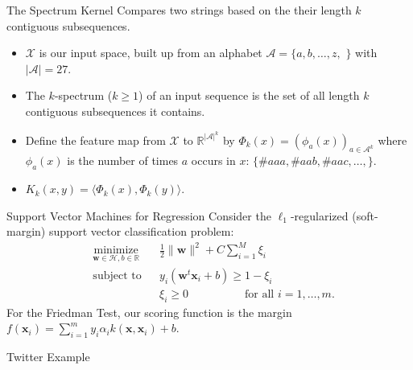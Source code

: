 \documentclass{beamer}
\providecommand{\norm}[1]{\lVert#1\rVert}
\begin{document}
\begin{frame}{The Spectrum Kernel}
  Compares two strings based on the their length $k$ contiguous
  subsequences. \pause
  \begin{itemize}
  \item $\mathcal{X}$ is our input space, built up from an alphabet
    $\mathcal{A} = \{a,b,\ldots,z,$ $\}$ with $|\mathcal{A}|=27$. \pause
  \item The $k$-spectrum ($k \geq 1$) of an input sequence is the set
    of all length $k$ contiguous subsequences it contains. \pause
  \item Define the feature map from $\mathcal{X}$ to
    $\mathbb{R}^{|\mathcal{A}|^k}$ by $\Phi_k(x) = (\phi_a(x))_{a \in
      \mathcal{A}^k}$ where $\phi_a(x)$ is the number of times $a$
    occurs in $x$: $\{\#aaa,\#aab,\#aac,\ldots,\}$. \pause
  \item $K_k(x,y) = \langle \Phi_k(x),\Phi_k(y) \rangle$.
  \end{itemize}
\end{frame}

\begin{frame}{Support Vector Machines for Regression}
Consider the $\ell_1$-regularized (soft-margin) support vector classification problem:
\begin{equation*}
\begin{aligned}
& \underset{\mathbf{w} \in \mathcal{H}, b \in \mathbb{R}}{\text{minimize}}
& &\frac{1}{2}\norm{\mathbf{w}}^2+C\sum_{i=1}^M \xi_i \\
& \text{subject to}
& & y_i(\mathbf{w}^t \mathbf{x}_i + b) \geq 1 - \xi_i \\
&&& \xi_i \geq 0 \qquad \qquad \quad \text{for all } i=1,\ldots,m.
\end{aligned}
\end{equation*}
For the Friedman Test, our scoring function is the margin
$f(\mathbf{x}_i) = \sum_{i=1}^m y_i \alpha_i k(\mathbf{x}, \mathbf{x}_i) + b$.
\end{frame}

\begin{frame}{Twitter Example}
  \begin{center}
    \resizebox{10.0cm}{!}{
      
    }
  \end{center}
\end{frame}
\end{document}
